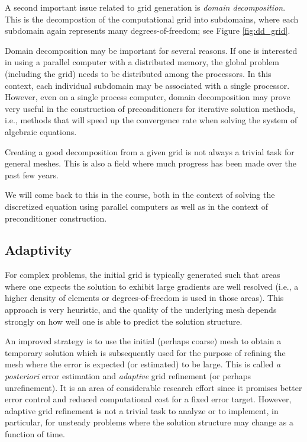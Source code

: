 \documentclass[11pt]{article}
\begin{document}
A second important issue related to grid generation is 
{\em domain decomposition}. This is the decompostion of 
the computational grid into subdomains, where each subdomain 
again represents many degrees-of-freedom; see Figure \ref{fig:dd_grid}. 

Domain decomposition may be important for several reasons. 
If one is interested in using a parallel computer with a 
distributed memory, the global problem (including the grid)
needs to be distributed among the processors. 
In this context, each individual subdomain may be associated 
with a single processor. However, even on a single process 
computer, domain decomposition
may prove very useful in the construction of preconditioners 
for iterative solution methods, i.e., methods that will speed 
up the convergence rate when solving the system of algebraic
equations.

Creating a good decomposition from a given grid is not always 
a trivial task for general meshes. This is also a field where
much progress has been made over the past few years. 

We will come back to this in the course, both in the context of solving
the discretized equation using parallel computers as well as in the context
of preconditioner construction.

\subsection{Adaptivity}

For complex problems, the initial grid is typically generated
such that areas where one expects the solution to exhibit 
large gradients are well resolved (i.e., a higher density of 
elements or degrees-of-freedom is used in those areas).
This approach is very heuristic, and the quality of the 
underlying mesh depends strongly on how well one is able 
to predict the solution structure. 

An improved strategy is to use the initial (perhaps coarse) 
mesh to obtain a temporary solution
which is subsequently used for the purpose of refining the mesh
where the error is expected (or estimated) to be large. 
This is called {\em a posteriori} error estimation and 
{\em adaptive} grid refinement (or perhaps unrefinement). 
It is an area of considerable 
research effort since it promises better error control and 
reduced computational cost for a fixed error target. 
However, adaptive grid refinement is not a trivial task to 
analyze or to implement, in particular, for unsteady problems
where the solution structure may change as a function of time.
\end{document}
